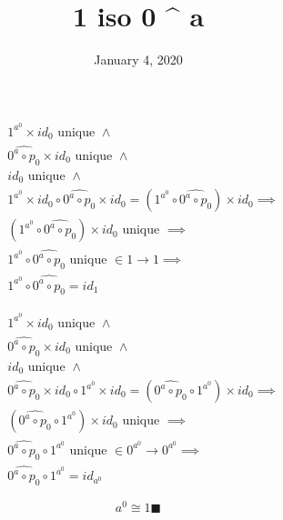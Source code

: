\documentclass[fleqn, 11pt]{article}
\date{January 4, 2020}
\title{1 iso 0 ^ a}
\begin{document}

\begin{equation}
\tag{from}
\begin{aligned}
& 1^{a^0} \times id_0 \text{ unique } \land \\
& \widehat{0^a \circ p_0} \times id_0 \text{ unique } \land \\
& id_0 \text{ unique } \land \\
& 1^{a^0} \times id_0 \circ \widehat{0^a \circ p_0} \times id_0 =
  (1^{a^0} \circ \widehat{0^a \circ p_0}) \times id_0 \implies \\
& (1^{a^0} \circ \widehat{0^a \circ p_0}) \times id_0 \text{ unique }
  \implies \\
& 1^{a^0} \circ \widehat{0^a \circ p_0} \text{ unique } \in 1 \rightarrow 1
  \implies \\
& 1^{a^0} \circ \widehat{0^a \circ p_0} = id_1
\end{aligned}
\end{equation}

\begin{equation}
\tag{to}
\begin{aligned}
& 1^{a^0} \times id_0 \text{ unique } \land \\
& \widehat{0^a \circ p_0} \times id_0 \text{ unique } \land \\
& id_0 \text{ unique } \land \\
& \widehat{0^a \circ p_0} \times id_0 \circ 1^{a^0} \times id_0 =
  (\widehat{0^a \circ p_0} \circ 1^{a^0}) \times id_0 \implies \\
& (\widehat{0^a \circ p_0} \circ 1^{a^0}) \times id_0 \text{ unique } \implies \\
& \widehat{0^a \circ p_0} \circ 1^{a^0} \text{ unique } \in 
  0^{a^0} \rightarrow 0^{a^0} \implies \\
& \widehat{0^a \circ p_0} \circ 1^{a^0} = id_{a^0}
\end{aligned}
\end{equation}

\hrulefill

$$ a^0 \cong 1 \blacksquare $$
\end{document}
